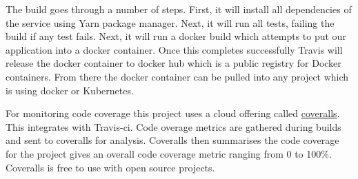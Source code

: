 The build goes through a number of steps. First, it will install all dependencies of the service using Yarn package manager. Next, it will run all tests, failing the build if any test fails. Next, it will run a docker build which attempts to put our application into a docker container. Once this completes successfully Travis will release the docker container to docker hub which is a public registry for Docker containers. From there the docker container can be pulled into any project which is using docker or Kubernetes.

For monitoring code coverage this project uses a cloud offering called \href{https://coveralls.io/}{coveralls}. This integrates with Travis-ci. Code overage metrics are gathered during builds and sent to coveralls for analysis. Coveralls then summarises the code coverage for the project gives an overall code coverage metric ranging from 0 to 100\%. Coveralls is free to use with open source projects.